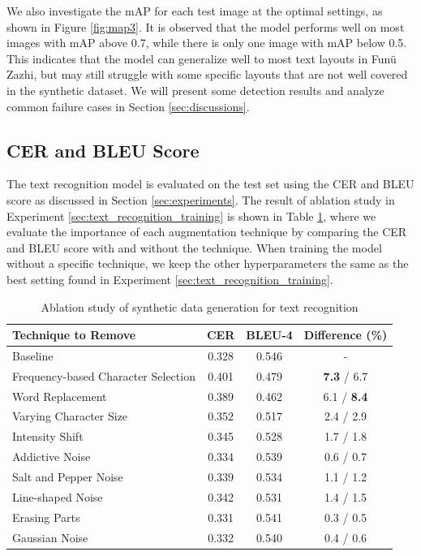 \documentclass[12pt,twoside]{report}
\begin{document}
We also investigate the mAP for each test image at the optimal settings, as shown in Figure \ref{fig:map3}. It is observed that the model performs well on most images with mAP above 0.7, while there is only one image with mAP below 0.5. This indicates that the model can generalize well to most text layouts in Funü Zazhi, but may still struggle with some specific layouts that are not well covered in the synthetic dataset. We will present some detection results and analyze common failure cases in Section \ref{sec:discussions}.

\subsection{CER and BLEU Score}
\label{sec:cer_bleu}
The text recognition model is evaluated on the test set using the CER and BLEU score as discussed in Section \ref{sec:experiments}. The result of ablation study in Experiment \ref{sec:text_recognition_training} is shown in Table \ref{tab:cer_bleu_ablation}, where we evaluate the importance of each augmentation technique by comparing the CER and BLEU score with and without the technique. When training the model without a specific technique, we keep the other hyperparameters the same as the best setting found in Experiment \ref{sec:text_recognition_training}.

\begin{table}[htbp]
    \centering
    \begin{tabular}{lccc}
        \toprule
        Technique to Remove & CER & BLEU-4 & Difference (\%) \\
        \midrule
        Baseline & 0.328 & 0.546 & - \\
        Frequency-based Character Selection & 0.401 & 0.479 & \textbf{7.3} / 6.7 \\
        Word Replacement & 0.389 & 0.462 & 6.1 / \textbf{8.4} \\
        Varying Character Size & 0.352 & 0.517 & 2.4 / 2.9 \\
        Intensity Shift & 0.345 & 0.528 & 1.7 / 1.8 \\
        Addictive Noise & 0.334 & 0.539 & 0.6 / 0.7 \\
        Salt and Pepper Noise & 0.339 & 0.534 & 1.1 / 1.2 \\
        Line-shaped Noise & 0.342 & 0.531 & 1.4 / 1.5 \\
        Erasing Parts & 0.331 & 0.541 & 0.3 / 0.5 \\
        Gaussian Noise & 0.332 & 0.540 & 0.4 / 0.6 \\
        \bottomrule
    \end{tabular}
    \caption{Ablation study of synthetic data generation for text recognition}
    \label{tab:cer_bleu_ablation}
\end{table}
\end{document}
